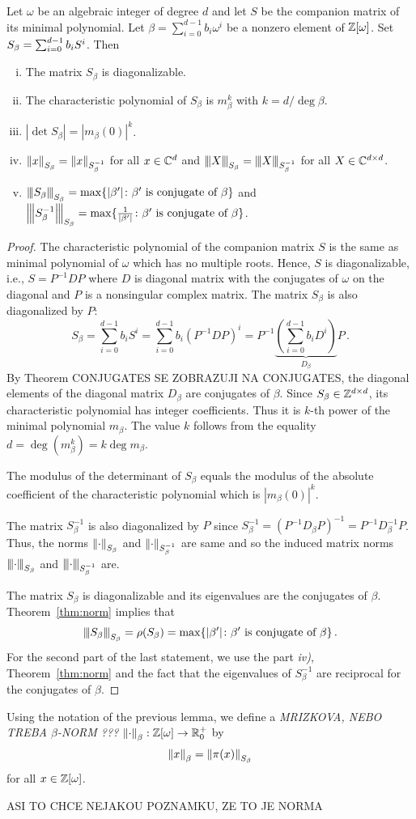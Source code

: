 \begin{lem}
\label{lem:propertiesSbeta}
Let $\omega$ be an algebraic integer of degree $d$ and let $S$ be the companion matrix of its minimal polynomial. Let $\beta=\sum_{i=0}^{d-1} b_i \omega^i$ be a nonzero element of $\mathbb{Z}[\omega]$. Set $S_\beta=\sum_{i=0}^{d-1} {b}_i S^i$. Then
\begin{enumerate}[i)]
   \item The matrix $S_\beta$ is diagonalizable.
   \item The characteristic polynomial of $S_\beta$ is $m_\beta^k$ with $k=d / \deg \beta$.
   \item $|\det S_\beta|=|m_\beta(0)|^k$.
   \item $\left\lVert x\right\rVert_{S_\beta}=\left\lVert x\right\rVert_{S_\beta^{-1}}$ for all $x \in \mathbb{C}^d$ and ${\left\vert\kern-0.25ex\left\vert\kern-0.25ex\left\vert X\right\vert\kern-0.25ex\right\vert\kern-0.25ex\right\vert}_{S_\beta}={\left\vert\kern-0.25ex\left\vert\kern-0.25ex\left\vert X\right\vert\kern-0.25ex\right\vert\kern-0.25ex\right\vert}_{S_\beta^{-1}}$ for all $X \in \mathbb{C}^{d\times d}$.
   \item ${\left\vert\kern-0.25ex\left\vert\kern-0.25ex\left\vert S_\beta\right\vert\kern-0.25ex\right\vert\kern-0.25ex\right\vert}_{S_\beta}=\max \{|\beta'| \colon \beta' \text{ is conjugate of } \beta\}$ and $ {\left\vert\kern-0.25ex\left\vert\kern-0.25ex\left\vert S_\beta^{-1}\right\vert\kern-0.25ex\right\vert\kern-0.25ex\right\vert}_{S_\beta}=\max \{\frac{1}{|\beta'|} \colon \beta' \text{ is conjugate of } \beta\}$.
\end{enumerate}  
\end{lem}
\begin{proof}
The characteristic polynomial of the companion matrix $S$ is the same as minimal polynomial of $\omega$ which has no multiple roots. Hence, $S$ is diagonalizable, i.e., $S=P^{-1}DP$ where $D$ is diagonal matrix with the conjugates of $\omega$ on the diagonal and $P$ is a nonsingular complex matrix. The matrix $S_\beta$ is also diagonalized by $P$:
$$
S_\beta=\sum_{i=0}^{d-1} b_i S^i= \sum_{i=0}^{d-1} b_i \left(P^{-1}DP\right)^i=P^{-1}\underbrace{\left(\sum_{i=0}^{d-1} b_i D^i\right)}_{D_\beta}P\,.
$$
By Theorem CONJUGATES SE ZOBRAZUJI NA CONJUGATES, the diagonal elements of the diagonal matrix $D_\beta$ are conjugates of $\beta$. Since $S_\beta\in\mathbb{Z}^{d\times d}$, its characteristic polynomial has integer coefficients. Thus it is $k$-th power of the minimal polynomial $m_\beta$. The value $k$ follows from the equality $d=\deg(m_\beta^k)=k \deg m_\beta$. 

The modulus of the determinant of $S_\beta$ equals the modulus of the absolute coefficient of the characteristic polynomial which is $|m_\beta(0)|^k$.

The matrix $S_\beta^{-1}$ is also diagonalized by $P$ since $S_\beta^{-1}=(P^{-1}D_\beta P)^{-1}=P^{-1}D_\beta^{-1}P$. Thus, the norms $\left\lVert\cdot\right\rVert_{S_\beta}$ and $\left\lVert\cdot\right\rVert_{S_\beta^{-1}}$ are same and so the induced matrix norms ${\left\vert\kern-0.25ex\left\vert\kern-0.25ex\left\vert \cdot\right\vert\kern-0.25ex\right\vert\kern-0.25ex\right\vert}_{S_\beta}$ and ${\left\vert\kern-0.25ex\left\vert\kern-0.25ex\left\vert \cdot\right\vert\kern-0.25ex\right\vert\kern-0.25ex\right\vert}_{S_\beta^{-1}}$ are.

The matrix $S_\beta$ is diagonalizable and its eigenvalues are the conjugates of $\beta$. Theorem~\ref{thm:norm} implies that 
$$
{\left\vert\kern-0.25ex\left\vert\kern-0.25ex\left\vert S_\beta\right\vert\kern-0.25ex\right\vert\kern-0.25ex\right\vert}_{S_\beta}=\rho(S_\beta)= \max \{|\beta'| \colon \beta' \text{ is conjugate of } \beta\}\,. 
$$
For the second part of the last statement, we use the part \textit{iv)}, Theorem~\ref{thm:norm} and the fact that the eigenvalues of $S_\beta^{-1}$ are  reciprocal for the conjugates of $\beta$.
\end{proof}

\begin{defn}
Using the notation of the previous lemma, we define a \emph{MRIZKOVA, NEBO TREBA $\beta$-NORM ???} $\left\lVert\cdot\right\rVert_{\beta}:\mathbb{Z}[\omega] \rightarrow \mathbb{R}^+_0$ by 
$$
\left\lVert x\right\rVert_{\beta}=\left\lVert\pi(x)\right\rVert_{S_\beta}
$$
for all $x\in\mathbb{Z}[\omega]$.
\end{defn}
ASI TO CHCE NEJAKOU POZNAMKU, ZE TO JE NORMA

